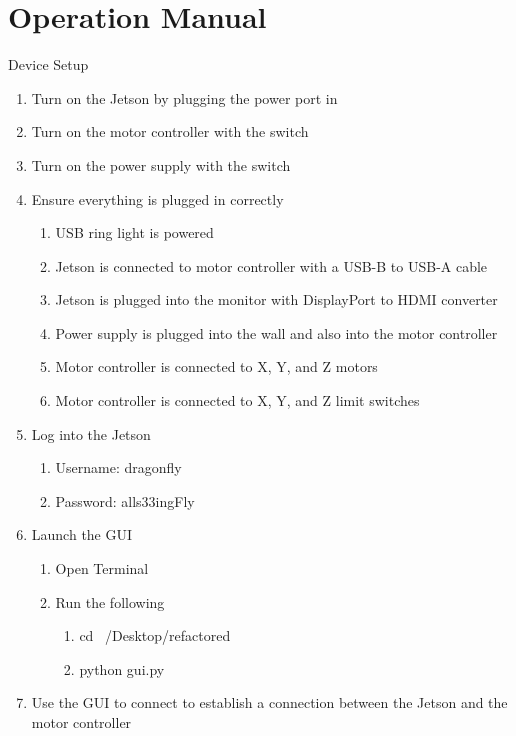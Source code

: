 \documentclass{article}
\begin{document}
\section {Operation Manual}
\begin{outline}[enumerate]

\1 Device Setup
\begin{enumerate}
	\item Turn on the Jetson by plugging the power port in
	\item Turn on the motor controller with the switch
	\item Turn on the power supply with the switch 
	\item Ensure everything is plugged in correctly
        \begin{enumerate}
        \item USB ring light is powered
        \item Jetson is connected to motor controller with a USB-B to USB-A cable
        \item Jetson is plugged into the monitor with DisplayPort to HDMI converter
        \item Power supply is plugged into the wall and also into the motor controller
        \item Motor controller is connected to X, Y, and Z motors
        \item Motor controller is connected to X, Y, and Z limit switches
        \end{enumerate}
    \item Log into the Jetson
        \begin{enumerate}
        \item Username: dragonfly
        \item Password: alls33ingFly
        \end{enumerate}
    \item Launch the GUI
        \begin{enumerate}
        \item Open Terminal
        \item Run the following
            \begin{enumerate}
                \item cd ~/Desktop/refactored
                \item python gui.py
            \end{enumerate}
        \end{enumerate}
    \item Use the GUI to connect to establish a connection between the Jetson and the motor controller

\end{enumerate}
\end{outline}
\end{document}
